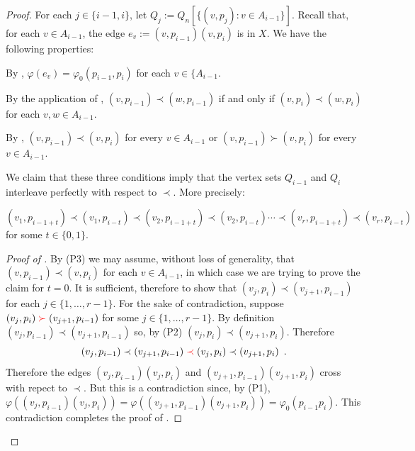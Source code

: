 \documentclass[kpfonts]{patmorin}
\begin{document}
\begin{proof}
    For each $j\in\{i-1,i\}$, let $Q_j:=Q_n[\{(v,p_j):v\in A_{i-1}\}]$.
    Recall that, for each $v\in A_{i-1}$, the edge $e_v:=(v,p_{i-1})(v,p_i)$ is in $X$.  We have the following properties:
    \begin{compactenum}[(P1)]
        \item By , $\varphi(e_v)=\varphi_0(p_{i-1},p_i)$ for each $v\in\{A_{i-1}$.
        \item By the application of , $(v,p_{i-1})\prec (w,p_{i-1})$ if and only if $(v,p_{i})\prec (w,p_{i})$ for each $v,w\in A_{i-1}$.
        \item By , $(v,p_{i-1})\prec (v,p_i)$ for every $v\in A_{i-1}$ or $(v,p_{i-1})\succ (v,p_i)$ for every $v\in A_{i-1}$.
    \end{compactenum}
    We claim that these three conditions imply that the vertex sets $Q_{i-1}$ and $Q_{i}$ interleave perfectly with respect to $\prec$. More precisely:
	\begin{clm} $(v_1,p_{i-1+t})\prec (v_1,p_{i-t}) \prec (v_2,p_{i-1+t}) \prec (v_2,p_{i-t}) \cdots \prec (v_r,p_{i-1+t}) \prec (v_r,p_{i-t})$ for some $t\in\{0,1\}$.
	\end{clm}
	\begin{proof}[Proof of ]
		By (P3) we may assume, without loss of generality, that $(v,p_{i-1})\prec (v,p_i)$ for each $v\in A_{i-1}$, in which case we are trying to prove the claim for $t=0$.  It is sufficient, therefore to show that $(v_j,p_i)\prec (v_{j+1},p_{i-1})$ for each $j\in\{1,\ldots,r-1\}$.  For the sake of contradiction, suppose $(v_j,p_{i}){\color{red}{}\succ{}} (v_{j+1},p_{i-1})$ for some $j\in\{1,\ldots,r-1\}$. By definition $(v_j,p_{i-1})\prec (v_{j+1},p_{i-1})$ so, by (P2)  $(v_{j},p_i) \prec (v_{j+1},p_i)$.  Therefore
		\[
			(v_j,p_{i-1})\prec (v_{j+1},p_{i-1}) {\color{red}{}\prec{}} (v_{j},p_i) \prec
		   (v_{j+1}, p_i) \enspace .
	   	\]
		Therefore the edges $(v_j,p_{i-1})(v_j,p_{i})$ and $(v_{j+1},p_{i-1})(v_{j+1},p_i)$ cross with repect to $\prec$.  But this is a contradiction since, by (P1),  $\varphi((v_j,p_{i-1})(v_j,p_{i})) =\varphi((v_{j+1},p_{i-1})(v_{j+1},p_i))=\varphi_0(p_{i-1}p_i)$.
		This contradiction completes the proof of .
	\end{proof}



\end{proof}
\end{document}

